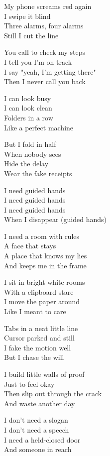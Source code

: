 \begin{lyrics}
My phone screams red again\\
I swipe it blind\\
Three alarms, four alarms\\
Still I cut the line

You call to check my steps\\
I tell you I'm on track\\
I say "yeah, I'm getting there"\\
Then I never call you back

I can look busy\\
I can look clean\\
Folders in a row\\
Like a perfect machine

But I fold in half\\
When nobody sees\\
Hide the delay\\
Wear the fake receipts

I need guided hands\\
I need guided hands\\
I need guided hands\\
When I disappear (guided hands)

I need a room with rules\\
A face that stays\\
A place that knows my lies\\
And keeps me in the frame

I sit in bright white rooms\\
With a clipboard stare\\
I move the paper around\\
Like I meant to care

Tabs in a neat little line\\
Cursor parked and still\\
I fake the motion well\\
But I chase the will

I build little walls of proof\\
Just to feel okay\\
Then slip out through the crack\\
And waste another day

I don't need a slogan\\
I don't need a speech\\
I need a held-closed door\\
And someone in reach


\end{lyrics}
